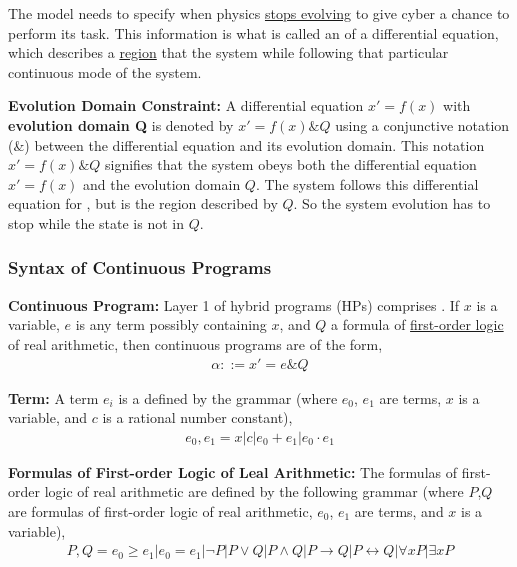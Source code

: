 The model needs to specify when physics \underline{stops evolving} to 
give cyber a chance to perform its task.
This information is what is called an  of 
a differential equation,
which describes a \underline{region} that the system  
while following that particular continuous mode of the system.

\textbf{Evolution Domain Constraint:} 
A differential equation $x' = f(x)$ with \textbf{evolution domain Q} 
is denoted by $x' = f(x) \& Q$ using a conjunctive notation (\&) 
between the differential equation and its evolution domain.
This notation $x' = f(x) \& Q$ signifies that the system obeys 
both the differential equation $x' = f(x)$ and the evolution domain $Q$. 
The system follows this differential equation for 
, 
but is  the region described by $Q$.
So the system evolution has to stop while the state is not in $Q$.

\subsubsection{Syntax of Continuous Programs}

\textbf{Continuous Program:} 
Layer 1 of hybrid programs (HPs) comprises . 
If $x$ is a variable, $e$ is any term possibly containing $x$,
and $Q$ a formula of \underline{first-order logic} of real arithmetic, 
then continuous programs are of the form,
\begin{align*}
  \alpha ::= x' = e \& Q
\end{align*}

\textbf{Term:} A term $e_i$ is a  defined by 
the grammar (where $e_0$, $e_1$ are terms, $x$ is a variable, 
and $c$ is a rational number constant),
\begin{align*}
  e_0, e_1 = x | c | e_0 + e_1 | e_0 \cdot e_1
\end{align*}

\textbf{Formulas of First-order Logic of Leal Arithmetic:}
The formulas of first-order logic of real arithmetic are defined by the 
following grammar (where $P$,$Q$ are formulas of first-order logic of 
real arithmetic, $e_0$, $e_1$ are terms, and $x$ is a variable),
\begin{align*}
  P, Q = e_0 \geq e_1 | e_0 = e_1 | \neg{P} | P \vee Q | P \wedge Q | 
    P \rightarrow Q | P \leftrightarrow Q | \forall{x}P | \exists{x}P
\end{align*}

